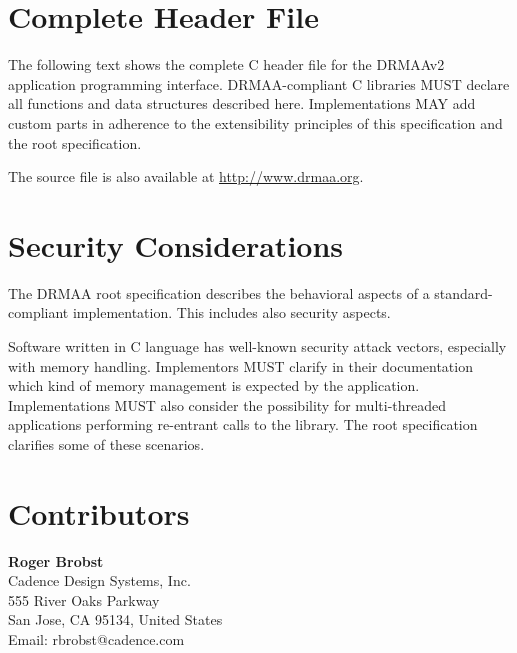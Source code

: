 \documentclass{article}
\begin{document}

\section{Complete Header File}
\label{sec:idl}

The following text shows the complete C header file for the DRMAAv2 application programming interface. DRMAA-compliant C libraries MUST declare all functions and data structures described here. Implementations MAY add custom parts in adherence to the extensibility principles of this specification and the root specification.

The source file is also available at \url{http://www.drmaa.org}.



\section{Security Considerations}
\label{sec:security}

The DRMAA root specification \cite{gfd194}  describes the behavioral aspects of a standard-compliant implementation. This includes also security aspects.

Software written in C language has well-known security attack vectors, especially with memory handling. Implementors MUST clarify in their documentation which kind of memory management is expected by the application. Implementations MUST also consider the possibility for multi-threaded applications performing re-entrant calls to the library. The root specification clarifies some of these scenarios.

\newpage

\section{Contributors}

\textbf{Roger Brobst}\\
Cadence Design Systems, Inc.\\
555 River Oaks Parkway \\
San Jose, CA 95134, United States\\
Email: rbrobst@cadence.com\\  
\end{document}
